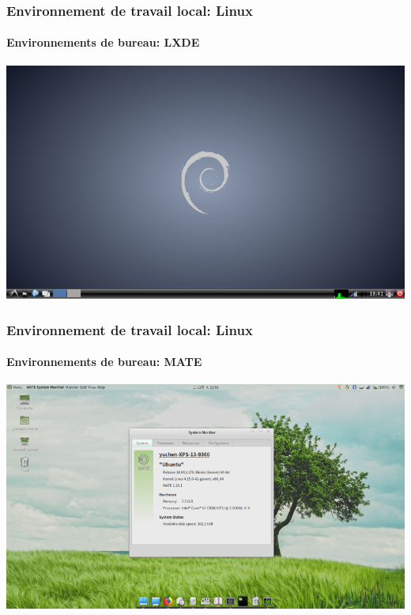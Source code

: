 \documentclass{beamer}
\begin{document}
\begin{frame}
\frametitle{Environnement de travail local: Linux}
\framesubtitle{Environnements de bureau: LXDE}

\begin{center}
	\includegraphics[height=
.8\textheight]{../img/Bweb01-environnement/lxde.png}
\end{center}

\end{frame}

\begin{frame}
\frametitle{Environnement de travail local: Linux}
\framesubtitle{Environnements de bureau: MATE}

\begin{center}
	\includegraphics[height=
.8\textheight]{../img/Bweb01-environnement/mate.png}
\end{center}

\end{frame}
\end{document}
